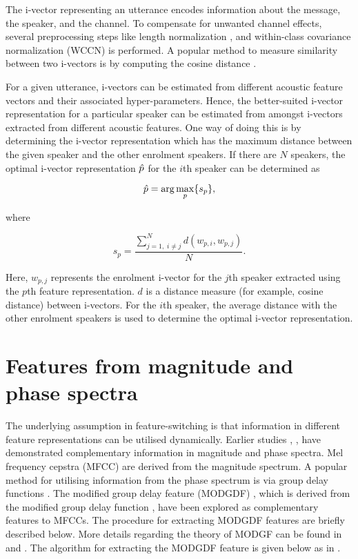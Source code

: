 \documentclass{article}
\begin{document}
The i-vector representing an utterance encodes information about the message,
the speaker, and the channel. To compensate for unwanted channel effects,
several preprocessing steps like length normalization \cite{garcia_lengthNorm},
and within-class covariance normalization (WCCN) \cite{wccn} is performed. A
popular method to measure similarity between two i-vectors is by computing the
cosine distance \cite{dehak_ivector}.

For a given utterance, i-vectors can be estimated from different acoustic
feature vectors and their associated hyper-parameters. Hence, the
better-suited i-vector representation for a particular speaker can be estimated
from amongst i-vectors extracted from different acoustic features. One way of
doing this is by determining the i-vector representation which has the maximum
distance between the given speaker and the other enrolment speakers. If there
are $N$ speakers, the optimal i-vector representation $\Hat{p}$ 
for the $i$th speaker can be determined as

\begin{equation}
\Hat{p} = \arg\max_p \{s_p\},
\label{eq:opt_ivec}
\end{equation}

where 

\begin{equation}
s_p = \frac{\displaystyle \sum_{j=1, \; i \neq j}^N d(w_{p,i},w_{p,j})}{N}.
\label{eq:sp}
\end{equation}

Here, $w_{p,j}$ represents the enrolment i-vector for the $j$th speaker
extracted using the $p$th feature representation. $d$ is a distance measure (for
example, cosine distance) between i-vectors. For the $i$th speaker, the average
distance with the other enrolment speakers is used to determine the optimal
i-vector representation. 

\section{Features from magnitude and phase spectra}
\label{sec:featExt}

The underlying assumption in feature-switching is that information in different
feature representations can be utilised dynamically. Earlier studies \cite{complement1},
\cite{complement2}, \cite{mgd_complement} have demonstrated complementary information in
magnitude and phase spectra. Mel frequency cepstra (MFCC) are derived from the magnitude
spectrum. A popular method for utilising information from the phase spectrum is
via group delay functions \cite{group_delay}. The modified group delay feature (MODGDF) 
\cite{modgd_feat}, which is derived from the modified group delay function
\cite{modgd_func}, have been explored as complementary features to MFCCs. The procedure for
extracting MODGDF features are briefly described below. More details regarding the theory
of MODGF can be found in \cite{modgd_func} and \cite{modgd_feat}. The algorithm for extracting the MODGDF feature is given below as in \cite{hegdeModgdf}.
\end{document}
